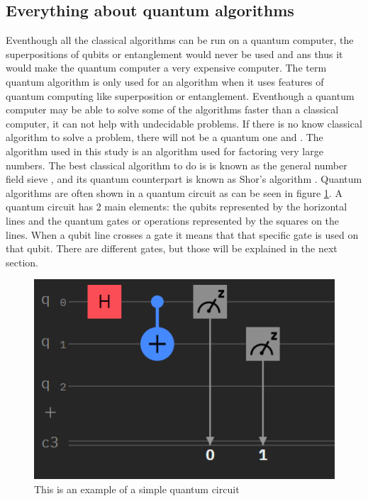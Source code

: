 \subsection{Everything about quantum algorithms}
Eventhough all the classical algorithms can be run on a quantum computer, the superpositions of qubits or entanglement would never be used \autocite{qalgo} and \autocite{quantumalgo} ans thus it would make the quantum computer a very expensive computer.
The term quantum algorithm is only used for an algorithm when it uses features of quantum computing like superposition or entanglement.
Eventhough a quantum computer may be able to solve some of the algorithms faster than a classical computer, it can not help with undecidable problems. If there is no know classical algorithm to solve a problem, there will not be a quantum one \autocite{undecidable} and \autocite{quantumalgo}.
The algorithm used in this study is an algorithm used for factoring very large numbers. The best classical algorithm to do is is known as the general number field sieve \autocite{GNFS}, and its quantum counterpart is known as Shor's algorithm \autocite{Shor}.
Quantum algorithms are often shown in a quantum circuit as can be seen in figure \ref{fig:Quantum circuit}. A quantum circuit has 2 main elements: the qubits represented by the horizontal lines and the quantum gates or operations represented by the squares on the lines.
When a qubit line crosses a gate it means that that specific gate is used on that qubit. There are different gates, but those will be explained in the next section.

\begin{figure} [h]
    \centering
    \includegraphics[width=\textwidth]{img/circuitVB.PNG}
        \caption{This is an example of a simple quantum circuit}
        \label{fig:Quantum circuit}
\end{figure}

